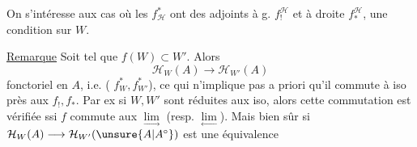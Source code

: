 On s'intéresse aux cas où les $f_{\mathcal H}^{*}$
ont des adjoints à g. $f_!^{\mathcal H}$ et à
droite $f_*^{\mathcal H}$, une condition sur $W$.

\uline{Remarque} Soit
tel que $f(W)\subset W'$. Alors
\[
\mathcal H_W(A)\longrightarrow\mathcal H_{W'}(A)
\]
fonctoriel en $A$,
i.e. ( $f_W^{*},f_{W'}^{*}$), ce qui
n'implique pas a priori qu'il commute
à iso près aux $f_!,f_*$.
Par ex si $W,W'$ sont réduites aux iso, alors
cette commutation  est vérifiée
ssi $f$ commute aux $\underset{\longrightarrow}{\lim}$
(resp. $\underset{\longleftarrow}{\lim}$).
Mais bien sûr
si $\mathcal H_W(A)\longrightarrow\mathcal H_{W'}(\unsure{A|A^{\circ}})$ est une équivalence

